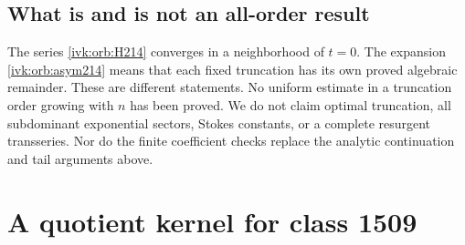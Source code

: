 \documentclass[11pt,letterpaper]{article}
\theoremstyle{remark}\newtheorem{remark}[theorem]{Remark}
\begin{document}
\subsection{What is and is not an all-order result}
The series \eqref{ivk:orb:H214} converges in a neighborhood of $t=0$.
The expansion \eqref{ivk:orb:asym214} means that each fixed truncation has its
own proved algebraic remainder. These are different statements.
No uniform estimate in a truncation order growing with $n$ has been
proved. We do not claim optimal truncation, all subdominant exponential
sectors, Stokes constants, or a complete resurgent transseries. Nor do
the finite coefficient checks replace the analytic continuation and
tail arguments above.

\section{A quotient kernel for class 1509}\label{ivk:orb:sec1509}
\end{document}
